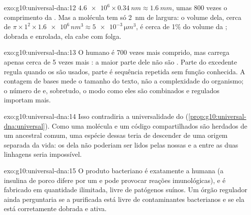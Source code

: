 \begin{solution}{exo:g10:universal-dna:12}
$\num{4.6e6} \times \qty{0.34}{nm} \approx \qty{1.6}{mm}$, umas 800
vezes o comprimento da . Mas a molécula tem só \qty{2}{nm} de
largura: o volume dela, cerca de $\pi \times 1^2 \times \num{1.6e6}\,
\unit{nm^3} \approx \num{5e-3}\,\unit{\micro m^3}$, é cerca de 1\% do
volume da ; dobrada e enrolada, ela cabe com folga.
\end{solution}

\begin{solution}{exo:g10:universal-dna:13}
O  humano é 700 vezes mais comprido, mas carrega apenas cerca de 5
vezes mais : a maior parte dele não são . Parte do 
excedente regula quando os  são usados, parte é sequência repetida
sem função conhecida. A contagem de bases mede o tamanho do texto, não
a complexidade do organismo; o número de  e, sobretudo, o modo
como eles são combinados e regulados importam mais.
\end{solution}

\begin{solution}{exo:g10:universal-dna:14}
Isso contradiria a universalidade do 
(\cref{prop:g10:universal-dna:universal}). Como uma molécula e um código
compartilhados são herdados de um ancestral comum, uma espécie dessas
teria de descender de uma origem separada da vida: os  dela não
poderiam ser lidos pelas nossas  e a  entre as duas
linhagens seria impossível.
\end{solution}

\begin{solution}{exo:g10:universal-dna:15}
O produto bacteriano é exatamente a  humana (a insulina de
porco difere por um  e pode provocar reações imunológicas), e
é fabricado em quantidade ilimitada, livre de patógenos suínos. Um
órgão regulador ainda perguntaria se a  purificada está livre de
contaminantes bacterianos e se ela está corretamente dobrada e ativa.
\end{solution}

